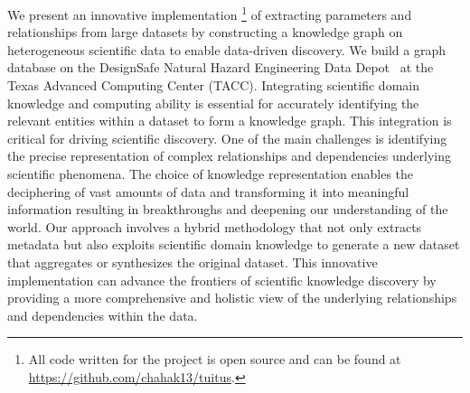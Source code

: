 \documentclass[acmsmall]{acmart}
\begin{document}
We present an innovative implementation \footnote{All code written for the project is open source and can be found at \url{https://github.com/chahak13/tuitus}.
} of extracting parameters and relationships from large datasets by constructing a knowledge graph on heterogeneous scientific data to enable data-driven discovery. 
We build a graph database on the DesignSafe Natural Hazard Engineering Data Depot~\cite{designsafe} at the Texas Advanced Computing Center (TACC). 
Integrating scientific domain knowledge and computing ability is essential for accurately identifying the relevant entities within a dataset to form a knowledge graph. 
This integration is critical for driving scientific discovery. 
One of the main challenges is identifying the precise representation of complex relationships and dependencies underlying scientific phenomena. 
The choice of knowledge representation enables the deciphering of vast amounts of data and transforming it into meaningful information resulting in breakthroughs and deepening our understanding of the world.
Our approach involves a hybrid methodology that not only extracts metadata but also exploits scientific domain knowledge to generate a new dataset that aggregates or synthesizes the original dataset. 
This innovative implementation can advance the frontiers of scientific knowledge discovery by providing a more comprehensive and holistic view of the underlying relationships and dependencies within the data.
\end{document}
